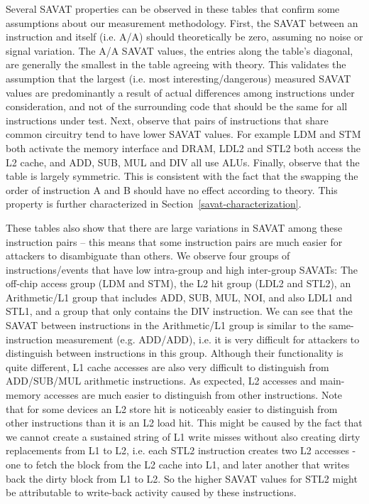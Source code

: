 Several SAVAT properties can be observed in these tables that confirm some assumptions about our measurement methodology. First, the SAVAT between an instruction and itself (i.e. A/A) should theoretically be zero, assuming no noise or signal variation. The A/A SAVAT values, the entries along the table's diagonal, are generally the smallest in the table agreeing with theory. This validates the assumption that the largest (i.e. most interesting/dangerous) measured SAVAT values are predominantly a result of actual differences among instructions under consideration, and not of the surrounding code that should be the same for all instructions under test. Next, observe that pairs of instructions that share common circuitry tend to have lower SAVAT values. For example LDM and STM both activate the memory interface and DRAM, LDL2 and STL2 both access the L2 cache, and ADD, SUB, MUL and DIV all use ALUs. Finally, observe that the table is largely symmetric. This is consistent with the fact that the swapping the order of instruction A and B should have no effect according to theory. This property is further characterized in Section~\ref{savat-characterization}. 

These tables also show that there are large variations in SAVAT among these instruction pairs -- this means that some instruction pairs are much easier for attackers to disambiguate than others. We observe four groups of instructions/events that have low intra-group and high inter-group SAVATs: The off-chip access group (LDM and STM), the L2 hit group (LDL2 and STL2), an Arithmetic/L1 group that includes ADD, SUB, MUL, NOI, and also LDL1 and STL1, and a group that only contains the DIV instruction. We can see that the SAVAT between instructions in the Arithmetic/L1 group is similar to the same-instruction measurement (e.g. ADD/ADD), i.e. it is very difficult for attackers to distinguish between instructions in this group. Although their functionality is quite different, L1 cache accesses are also very difficult to distinguish from ADD/SUB/MUL arithmetic instructions. As expected, L2 accesses and main-memory accesses are much easier to distinguish from other instructions. Note that for some devices an L2 store hit is noticeably easier to distinguish from other instructions than it is an L2 load hit. This might be caused by the fact that we cannot create a sustained string of L1 write misses without also creating dirty replacements from L1 to L2, i.e. each STL2 instruction creates two L2 accesses - one to fetch the block from the L2 cache into L1, and later another that writes back the dirty block from L1 to L2. So the higher SAVAT values for STL2 might be attributable to write-back activity caused by these instructions. %

